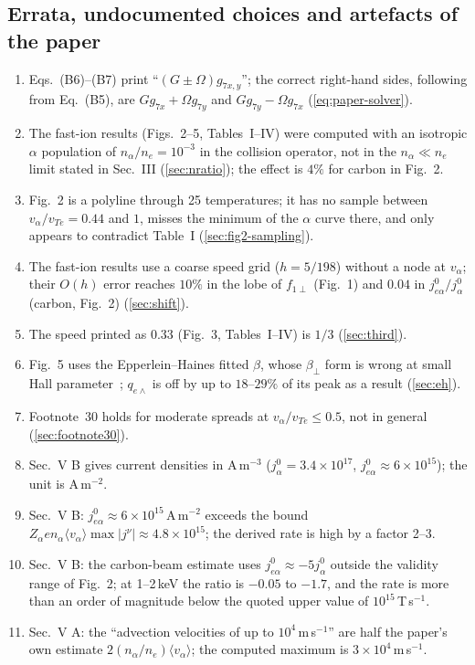 \documentclass[11pt,a4paper]{article}
\begin{document}
\subsection*{Errata, undocumented choices and artefacts of the paper}
\begin{enumerate}
   \item Eqs.~(B6)--(B7) print ``$(G\pm\Omega)g_{7x,y}$''; the correct right-hand sides, following from Eq.~(B5), are
         $Gg_{7x}+\Omega g_{7y}$ and $Gg_{7y}-\Omega g_{7x}$ (\cref{eq:paper-solver}).
   \item The fast-ion results (Figs.~2--5, Tables~I--IV) were computed with an isotropic $\alpha$ population of
         $n_\alpha/n_e=10^{-3}$ in the collision operator, not in the $n_\alpha\ll n_e$ limit stated in Sec.~III
         (\cref{sec:nratio}); the effect is $4\%$ for carbon in Fig.~2.
   \item Fig.~2 is a polyline through 25 temperatures; it has no sample between $v_\alpha/v_{Te}=0.44$ and $1$, misses the
         minimum of the $\alpha$ curve there, and only appears to contradict Table~I (\cref{sec:fig2-sampling}).
   \item The fast-ion results use a coarse speed grid ($h=5/198$) without a node at $v_\alpha$; their $O(h)$ error reaches
         $10\%$ in the lobe of $f_{1\perp}$ (Fig.~1) and $0.04$ in $j^0_{e\alpha}/j^0_\alpha$ (carbon, Fig.~2)
         (\cref{sec:shift}).
   \item The speed printed as 0.33 (Fig.~3, Tables~I--IV) is $1/3$ (\cref{sec:third}).
   \item Fig.~5 uses the Epperlein--Haines fitted $\beta$, whose $\beta_\perp$ form is wrong at small Hall
         parameter~\cite{sadler2021,davies2021}; $q_{e\wedge}$ is off by up to $18$--$29\%$ of its peak as a result
         (\cref{sec:eh}).
   \item Footnote~30 holds for moderate spreads at $v_\alpha/v_{Te}\le0.5$, not in general (\cref{sec:footnote30}).
   \item Sec.~V B gives current densities in A\,m$^{-3}$ ($j^0_\alpha=3.4\times10^{17}$, $j^0_{e\alpha}\approx6\times10^{15}$);
         the unit is A\,m$^{-2}$.
   \item Sec.~V B: $j^0_{e\alpha}\approx6\times10^{15}$\,A\,m$^{-2}$ exceeds the bound $Z_\alpha en_\alpha\langle
         v_\alpha\rangle\max|j^\nu|\approx4.8\times10^{15}$; the derived rate is high by a factor 2--3.
   \item Sec.~V B: the carbon-beam estimate uses $j^0_{e\alpha}\approx-5j^0_\alpha$ outside the validity range of Fig.~2; at
         1--2\,keV the ratio is $-0.05$ to $-1.7$, and the rate is more than an order of magnitude below the quoted upper
         value of $10^{15}$\,T\,s$^{-1}$.
   \item Sec.~V A: the ``advection velocities of up to $10^4$\,m\,s$^{-1}$'' are half the paper's own
         estimate $2(n_\alpha/n_e)\langle v_\alpha\rangle$; the computed maximum is $3\times10^4$\,m\,s$^{-1}$.
\end{enumerate}
\end{document}
